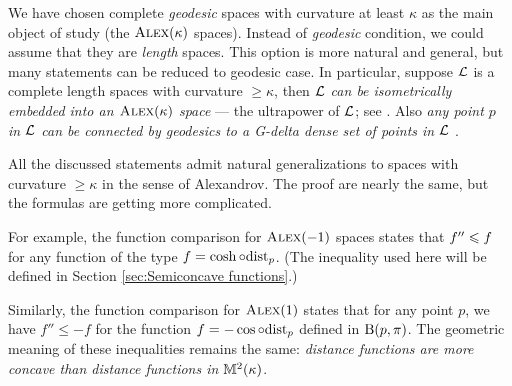 We have chosen complete \textit{geodesic} spaces with curvature at least $\kappa$ as the main object of study (the $\textsc{Alex}(\kappa)$ spaces).
Instead of \textit{geodesic} condition, we could assume that they are \textit{length} spaces. 
This option is more natural and general, but many statements can be reduced to geodesic case.
In particular, suppose $\mathcal{L}$ is a complete length spaces with curvature $\ge \kappa$,
then 
\textit{$\mathcal{L}$ can be isometrically embedded into an $\textsc{Alex}(\kappa)$ space} --- the ultrapower of $\mathcal{L}$; see \cite[4.11+8.4]{alexander-kapovitch-petrunin2024}.
Also \textit{any point $p$ in $\mathcal{L}$ can be connected by geodesics to a G-delta dense set of points in $\mathcal{L}$} 
\cite[8.11]{alexander-kapovitch-petrunin2024}.

All the discussed statements admit natural generalizations to 
spaces with curvature $\ge \kappa$ in the sense of Alexandrov.
The proof are nearly the same, but the formulas are getting more complicated.

For example, the function comparison for $\textsc{Alex}(-1)$ spaces states that 
$f''\z\le f$ for any function of the type $f=\cosh\circ\mathrm{dist}_p$.
(The inequality used here will be defined in Section \ref{sec:Semiconcave functions}.)

Similarly, the function comparison for $\textsc{Alex}(1)$ states that for any point $p$, we have
$f''\le -f$ for the function $f=-\cos\circ\mathrm{dist}_p$
defined in $\mathrm{B}{}(p,\pi)$.
The geometric meaning of these inequalities remains the same:
\textit{distance functions are more concave than distance functions in $\mathbb{M}^2(\kappa)$}.

